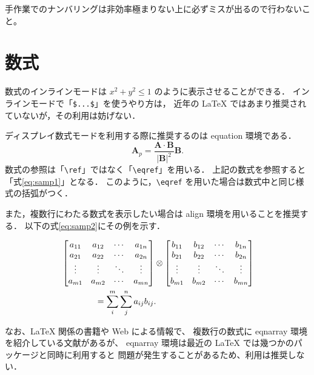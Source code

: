 \documentclass[12pt,a4paper,uplatex,dvipdfmx]{jsarticle}
\begin{document}
手作業でのナンバリングは非効率極まりない上に必ずミスが出るので行わないこと。

\section{数式}
\label{sec:eqn}

数式のインラインモードは \(x^2 + y^2 \leq 1\) のように表示させることができる．
インラインモードで「\verb+$...$+」を使うやり方は，
近年の LaTeX ではあまり推奨されていないが，その利用は妨げない．

ディスプレイ数式モードを利用する際に推奨するのは equation 環境である．
\begin{equation}
	\mathbf{A}_p = \frac{\mathbf{A}\cdot\mathbf{B}}{|\mathbf{B}|^2}\mathbf{B} .
	\label{eq:samp1}
\end{equation}
数式の参照は「\verb+\ref+」ではなく「\verb+\eqref+」を用いる．
上記の数式を参照すると「式\eqref{eq:samp1}」となる．
このように，\verb+\eqref+ を用いた場合は数式中と同じ様式の括弧がつく．

また，複数行にわたる数式を表示したい場合は align 環境を用いることを推奨する．
以下の式\eqref{eq:samp2}にその例を示す．

\begin{align}
	& \begin{bmatrix}
	a_{11} & a_{12} & \cdots & a_{1n} \\
	a_{21} & a_{22} & \cdots & a_{2n} \\
	\vdots & \vdots & \ddots & \vdots \\
	a_{m1} & a_{m2} & \cdots & a_{mn} \\
	\end{bmatrix}
	\otimes
	\begin{bmatrix}
	b_{11} & b_{12} & \cdots & b_{1n} \\
	b_{21} & b_{22} & \cdots & b_{2n} \\
	\vdots & \vdots & \ddots & \vdots \\
	b_{m1} & b_{m2} & \cdots & b_{mn} \\
	\end{bmatrix} \notag \\
	& \qquad \qquad = \sum_{i}^{m}\sum_{j}^{n}a_{ij}b_{ij} .
	\label{eq:samp2}
\end{align}

なお、LaTeX 関係の書籍や Web による情報で、
複数行の数式に eqnarray 環境を紹介している文献があるが、
eqnarray 環境は最近の LaTeX では幾つかのパッケージと同時に利用すると
問題が発生することがあるため、利用は推奨しない．
\end{document}
